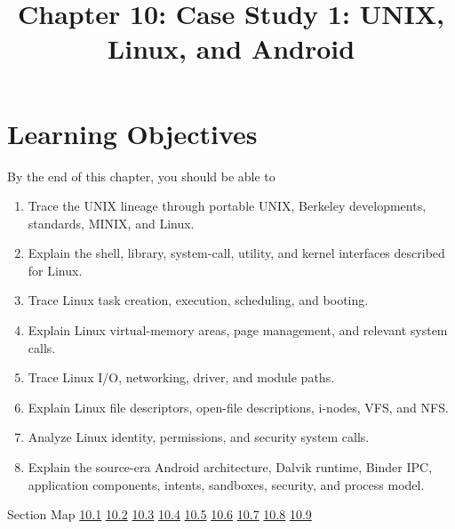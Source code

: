 \documentclass[10pt,letterpaper]{article}
\title{Chapter 10: Case Study 1: UNIX, Linux, and Android}
\author{}
\date{}
\begin{document}
\maketitle
\section*{Learning Objectives}
\begin{studybox}{By the end of this chapter, you should be able to}
\begin{enumerate}
  \item Trace the UNIX lineage through portable UNIX, Berkeley developments, standards, MINIX, and Linux.
  \item Explain the shell, library, system-call, utility, and kernel interfaces described for Linux.
  \item Trace Linux task creation, execution, scheduling, and booting.
  \item Explain Linux virtual-memory areas, page management, and relevant system calls.
  \item Trace Linux I/O, networking, driver, and module paths.
  \item Explain Linux file descriptors, open-file descriptions, i-nodes, VFS, and NFS.
  \item Analyze Linux identity, permissions, and security system calls.
  \item Explain the source-era Android architecture, Dalvik runtime, Binder IPC, application components, intents, sandboxes, security, and process model.
\end{enumerate}
\end{studybox}

\begin{studybox}{Section Map}
\hyperlink{sec-10-1}{10.1} \quad \hyperlink{sec-10-2}{10.2} \quad \hyperlink{sec-10-3}{10.3} \quad \hyperlink{sec-10-4}{10.4} \quad \hyperlink{sec-10-5}{10.5} \quad \hyperlink{sec-10-6}{10.6} \quad \hyperlink{sec-10-7}{10.7} \quad \hyperlink{sec-10-8}{10.8} \quad \hyperlink{sec-10-9}{10.9}
\end{studybox}
\end{document}
